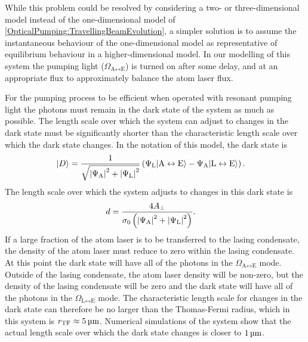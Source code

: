 While this problem could be resolved by considering a two- or three-dimensional model instead of the one-dimensional model of \eqref{OpticalPumping:TravellingBeamEvolution}, a simpler solution is to assume the instantaneous behaviour of the one-dimensional model as representative of equilibrium behaviour in a higher-dimensional model.  In our modelling of this system the pumping light ($\Omega_{\text{A}\leftrightarrow\text{E}}$) is turned on after some delay, and at an appropriate flux to approximately balance the atom laser flux.

For the pumping process to be efficient when operated with resonant pumping light the photons must remain in the dark state of the system as much as possible.  The length scale over which the system can adjust to changes in the dark state must be significantly shorter than the characteristic length scale over which the dark state changes.  In the notation of this model, the dark state is
\begin{align}
    \ket{D} &= \frac{1}{\sqrt{\abs{\Psi_\text{A}}^2 + \abs{\Psi_\text{L}}^2}} \left(\Psi_\text{L} \ket{\text{A} \leftrightarrow \text{E}}- \Psi_\text{A} \ket{\text{L} \leftrightarrow \text{E}}\right). \label{OpticalPumping:TravellingBeam:DarkState}
\end{align}
The length scale over which the system adjusts to changes in this dark state is
\begin{align}
     d &= \frac{4 A_\perp}{\sigma_0 \left(\left|\Psi_\text{A}\right|^2 + \left|\Psi_\text{L}\right|^2 \right)}.
\end{align}
If a large fraction of the atom laser is to be transferred to the lasing condensate, the density of the atom laser must reduce to zero within the lasing condensate.  At this point the dark state will have all of the photons in the $\Omega_{\text{A}\leftrightarrow\text{E}}$ mode.  Outside of the lasing condensate, the atom laser density will be non-zero, but the density of the lasing condensate will be zero and the dark state will have all of the photons in the $\Omega_{\text{L}\leftrightarrow\text{E}}$ mode.  The characteristic length scale for changes in the dark state can therefore be no larger than the Thomas-Fermi radius, which in this system is $r_\text{TF} \approx \unit[5]{\micro m}$.  Numerical simulations of the system show that the actual length scale over which the dark state changes is closer to $\unit[1]{\micro m}$.

